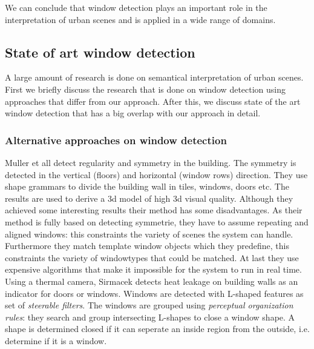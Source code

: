 We can conclude that window detection plays an important role in the
interpretation of urban scenes and is applied in a wide range of domains.  



\subsection{State of art window detection} %
A large amount of research is done on semantical interpretation of urban scenes. 
First we briefly discuss the research that is done on window detection using
approaches that differ from our approach.  After this, we discuss state of the art
window detection that has a big overlap with our approach in detail.\\

\subsubsection{Alternative approaches on window detection}
Muller et all \cite{Muller_procedural} detect regularity and symmetry in the building. The
symmetry is detected in the vertical (floors) and horizontal (window
rows) direction.
They use shape grammars to divide the building wall in tiles, windows, doors etc.
The results are used to derive a 3d model of high 3d visual quality.
Although they achieved some interesting results their method has some
disadvantages.  As their method is fully based on detecting symmetrie, they have
to assume repeating and aligned windows: this constraints the variety of scenes
the system can handle.
Furthermore they match template window objects which they predefine, this 
constraints the variety of windowtypes that could be matched.  At last 
they use expensive algorithms that make it impossible for the system
to run in real time.  \\

Using a thermal camera, Sirmacek \cite{Sirmacek_thermal}
detects heat leakage on building walls as an indicator for doors or windows.
Windows are detected with L-shaped features as set of \emph{steerable filters}.
The windows are grouped using \emph{perceptual organization rules}:
they search and group intersecting L-shapes to close a window shape. A shape is
determined closed if it can seperate an inside region from the outside, i.e.
determine if it is a window.  \\

